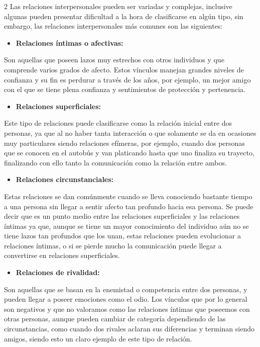 \documentclass[12pt,spanish,Letterpaper,openany]{book}
\providecommand{\tightlist}{%
  \setlength{\itemsep}{0pt}\setlength{\parskip}{0pt}}
\begin{document}
\begin {multicols}{2}
Las relaciones interpersonales pueden ser variadas y complejas, inclusive algunas pueden presentar dificultad a la hora de clasificarse en algún tipo, sin embargo, las relaciones interpersonales más comunes son las siguientes:

\begin{itemize}
\tightlist
\item
  \textbf{Relaciones íntimas o afectivas:}
\end{itemize}

Son aquellas que poseen lazos muy estrechos con otros individuos y que comprende varios grados de afecto. Estos vínculos manejan grandes niveles de confianza y su fin es perdurar a través de los años, por ejemplo, un mejor amigo con el que se tiene plena confianza y sentimientos de protección y pertenencia.

\begin{itemize}
\tightlist
\item
  \textbf{Relaciones superficiales:}
\end{itemize}

Este tipo de relaciones puede clasificarse como la relación inicial entre dos personas, ya que al no haber tanta interacción o que solamente se da en ocasiones muy particulares siendo relaciones efímeras, por ejemplo, cuando dos personas que se conocen en el autobús y van platicando hasta que uno finaliza su trayecto, finalizando con ello tanto la comunicación como la relación entre ambos.

\begin{itemize}
\tightlist
\item
  \textbf{Relaciones circunstanciales:}
\end{itemize}

Estas relaciones se dan comúnmente cuando se lleva conociendo bastante tiempo a una persona sin llegar a sentir afecto tan profundo hacia esa persona. Se puede decir que es un punto medio entre las relaciones superficiales y las relaciones íntimas ya que, aunque se tiene un mayor conocimiento del individuo aún no se tiene lazos tan profundos que los unan, estas relaciones pueden evolucionar a relaciones íntimas, o si se pierde mucho la comunicación puede llegar a convertirse en relaciones superficiales.

\begin{itemize}
\tightlist
\item
  \textbf{Relaciones de rivalidad:}
\end{itemize}

Son aquellas que se basan en la enemistad o competencia entre dos personas, y pueden llegar a poseer emociones como el odio. Los vínculos que por lo general son negativos y que no valoramos como las relaciones íntimas que poseemos con otras personas, aunque pueden cambiar de categoría dependiendo de las circunstancias, como cuando dos rivales aclaran sus diferencias y terminan siendo amigos, siendo esto un claro ejemplo de este tipo de relación.


\end{multicols}
\end{document}
